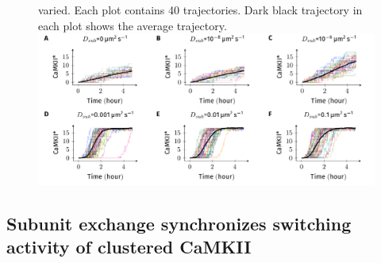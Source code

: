 \documentclass[9pt,lineno,doublespacing]{elife}
\begin{document}
\begin{figure}
{    varied.  Each plot contains 40 trajectories. Dark black trajectory in each
    plot shows the average trajectory.
}{\includegraphics[width=\linewidth]{./PaperFigures/suppl/figure_camkii_activations_trajs.pdf}}
\label{figsupp:camkii_activation_se_trajs} 
\end{figure}



\subsection{Subunit exchange synchronizes switching activity of clustered CaMKII}
\label{subsec:se_sync_switches}
\end{document}
